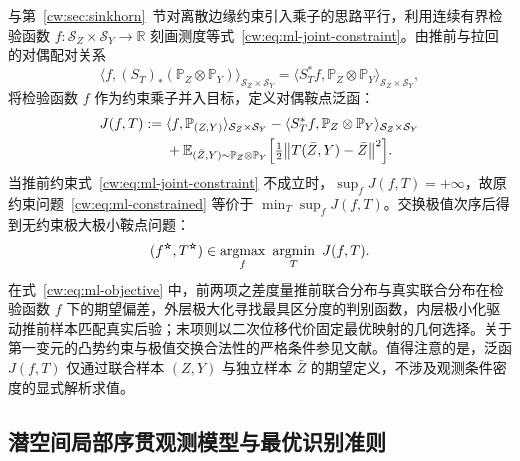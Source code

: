 与第~\ref{cw:sec:sinkhorn}~节对离散边缘约束引入乘子的思路平行，利用连续有界检验函数 $f:\mathcal S_Z\times\mathcal S_Y\to\mathbb R$ 刻画测度等式~\eqref{cw:eq:ml-joint-constraint}。由推前与拉回的对偶配对关系
\begin{equation}
\langle f,(S_T)_*(\mathbb P_Z\otimes\mathbb P_Y)\rangle_{\mathcal S_Z\times\mathcal S_Y}
=\langle S_T^*f,\mathbb P_Z\otimes\mathbb P_Y\rangle_{\mathcal S_Z\times\mathcal S_Y},
\end{equation}
将检验函数 $f$ 作为约束乘子并入目标，定义对偶鞍点泛函：
\begin{equation}\label{cw:eq:ml-objective}
\begin{aligned}
J(f,T):={}&\langle f,\mathbb P_{(Z,Y)}\rangle_{\mathcal S_Z\times\mathcal S_Y}
-\langle S_T^*f,\mathbb P_Z\otimes\mathbb P_Y\rangle_{\mathcal S_Z\times\mathcal S_Y}\\
&+\mathbb E_{(\bar Z,Y)\sim\mathbb P_Z\otimes\mathbb P_Y}\Bigl[\tfrac12\bigl\|T(\bar Z,Y)-\bar Z\bigr\|^2\Bigr].
\end{aligned}
\end{equation}
当推前约束式~\eqref{cw:eq:ml-joint-constraint} 不成立时，$\sup_f J(f,T)=+\infty$，故原约束问题~\eqref{cw:eq:ml-constrained} 等价于 $\min_T\sup_f J(f,T)$。交换极值次序后得到无约束极大极小鞍点问题：
\begin{equation}\label{cw:eq:ml-minimax}
(f^{\optstar},T^{\optstar})\in\operatorname*{argmax}_{f}\ \operatorname*{argmin}_{T}\ J(f,T).
\end{equation}
在式~\eqref{cw:eq:ml-objective} 中，前两项之差度量推前联合分布与真实联合分布在检验函数 $f$ 下的期望偏差，外层极大化寻找最具区分度的判别函数，内层极小化驱动推前样本匹配真实后验；末项则以二次位移代价固定最优映射的几何选择。关于第一变元的凸势约束与极值交换合法性的严格条件参见文献\cite{aljarrah2024brenier}。值得注意的是，泛函 $J(f,T)$ 仅通过联合样本 $(Z,Y)$ 与独立样本 $\bar Z$ 的期望定义，不涉及观测条件密度的显式解析求值。

\subsection{潜空间局部序贯观测模型与最优识别准则}\label{cw:sec:ml-problem}

